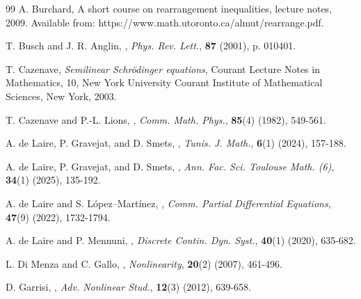 \documentclass[11pt]{article}
\theoremstyle{plain}
\theoremstyle{definition}
\theoremstyle{remark}
\numberwithin{equation}{section}
\begin{document}
{\begin{thebibliography}{99}
\newblock A. Burchard,
\newblock A short course on rearrangement inequalities,
\newblock lecture notes, 2009. Available from: {https://www.math.utoronto.ca/almut/rearrange.pdf}.

\newblock T. Busch and J. R. Anglin,
,
\newblock \emph{Phys. Rev. Lett.}, \textbf{87} (2001), p. 010401.

\newblock T. Cazenave,
\newblock \emph{Semilinear Schr\"odinger equations}, Courant Lecture Notes in Mathematics, 10, New York University Courant Institute of Mathematical Sciences, New York, 2003.

\newblock  T. Cazenave and P.-L. Lions,
,
\newblock \emph{Comm. Math. Phys.}, \textbf{85}(4) (1982), 549-561.

\newblock  A. de Laire, P. Gravejat, and D. Smets,
,
\newblock \emph{Tunis. J. Math.}, \textbf{6}(1) (2024), 157-188.

\newblock  A. de Laire, P. Gravejat, and D. Smets,
,
\newblock \emph{Ann. Fac. Sci. Toulouse Math. (6)}, \textbf{34}(1) (2025), 135-192.

\newblock  A. de Laire and S. L\'opez--Mart\'inez,
,
\newblock \emph{Comm. Partial Differential Equations}, \textbf{47}(9) (2022), 1732-1794.

\newblock  A. de Laire and P. Mennuni,
,
\newblock \emph{Discrete Contin. Dyn. Syst.}, \textbf{40}(1) (2020), 635-682.

\newblock  L. Di Menza and C. Gallo,
,
\newblock \emph{Nonlinearity}, \textbf{20}(2) (2007), 461-496.

\newblock D. Garrisi,
,
\newblock \emph{Adv. Nonlinear Stud.}, \textbf{12}(3) (2012), 639-658.


\end{thebibliography}}
\end{document}
